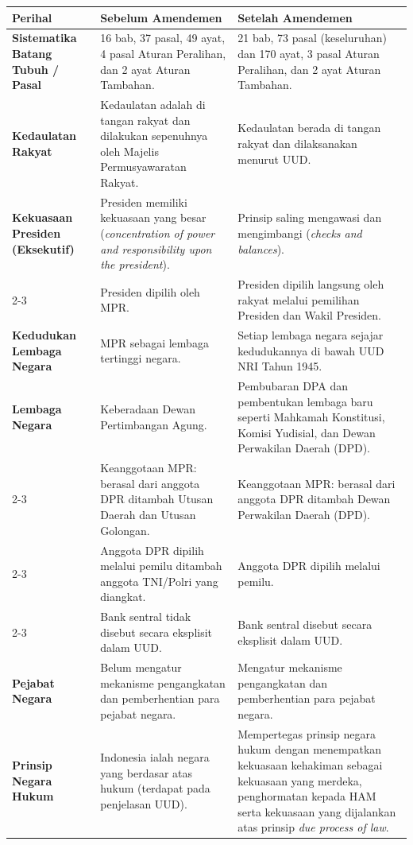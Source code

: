 \begin{table}[h!]
\centering
\small
\begin{tabular}{|p{3cm}|p{6cm}|p{6cm}|}
\hline
\textbf{Perihal} & \textbf{Sebelum Amendemen} & \textbf{Setelah Amendemen} \\ \hline
\textbf{Sistematika Batang Tubuh / Pasal} & 16 bab, 37 pasal, 49 ayat, 4 pasal Aturan Peralihan, dan 2 ayat Aturan Tambahan. & 21 bab, 73 pasal (keseluruhan) dan 170 ayat, 3 pasal Aturan Peralihan, dan 2 ayat Aturan Tambahan. \\ \hline
\textbf{Kedaulatan Rakyat} & Kedaulatan adalah di tangan rakyat dan dilakukan sepenuhnya oleh Majelis Permusyawaratan Rakyat. & Kedaulatan berada di tangan rakyat dan dilaksanakan menurut UUD. \\ \hline
\textbf{Kekuasaan Presiden (Eksekutif)} & Presiden memiliki kekuasaan yang besar (\textit{concentration of power and responsibility upon the president}). & Prinsip saling mengawasi dan mengimbangi (\textit{checks and balances}). \\ \cline{2-3}
 & Presiden dipilih oleh MPR. & Presiden dipilih langsung oleh rakyat melalui pemilihan Presiden dan Wakil Presiden. \\ \hline
\textbf{Kedudukan Lembaga Negara} & MPR sebagai lembaga tertinggi negara. & Setiap lembaga negara sejajar kedudukannya di bawah UUD NRI Tahun 1945. \\ \hline
\textbf{Lembaga Negara} & Keberadaan Dewan Pertimbangan Agung. & Pembubaran DPA dan pembentukan lembaga baru seperti Mahkamah Konstitusi, Komisi Yudisial, dan Dewan Perwakilan Daerah (DPD). \\ \cline{2-3}
 & Keanggotaan MPR: berasal dari anggota DPR ditambah Utusan Daerah dan Utusan Golongan. & Keanggotaan MPR: berasal dari anggota DPR ditambah Dewan Perwakilan Daerah (DPD). \\ \cline{2-3}
 & Anggota DPR dipilih melalui pemilu ditambah anggota TNI/Polri yang diangkat. & Anggota DPR dipilih melalui pemilu. \\ \cline{2-3}
 & Bank sentral tidak disebut secara eksplisit dalam UUD. & Bank sentral disebut secara eksplisit dalam UUD. \\ \hline
\textbf{Pejabat Negara} & Belum mengatur mekanisme pengangkatan dan pemberhentian para pejabat negara. & Mengatur mekanisme pengangkatan dan pemberhentian para pejabat negara. \\ \hline
\textbf{Prinsip Negara Hukum} & Indonesia ialah negara yang berdasar atas hukum (terdapat pada penjelasan UUD). & Mempertegas prinsip negara hukum dengan menempatkan kekuasaan kehakiman sebagai kekuasaan yang merdeka, penghormatan kepada HAM serta kekuasaan yang dijalankan atas prinsip \textit{due process of law}. \\ \hline

\end{tabular}
\end{table}

